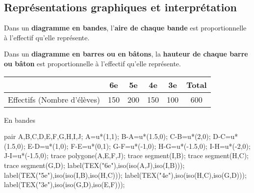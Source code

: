 \begin{changemargin}{0mm}{-15mm}
    \section{Représentations graphiques et interprétation}
    
    \begin{definition}
        Dans un \textbf{diagramme en bandes}, l'\textbf{aire de chaque bande} est proportionnelle à l'effectif qu'elle représente.
    \end{definition}
    \begin{definition}
        Dans un \textbf{diagramme en barres ou en bâtons}, la \textbf{hauteur de chaque barre ou bâton} est proportionnelle à l'effectif qu'elle représente.
    \end{definition}
    \begin{exemples*1}
        \begin{center}
            \begin{tabular}{|c|c|c|c|c|c|}
                \cline{2-6}
                \multicolumn{1}{c|}{}&6e&5e&4e&3e&Total\\
                \hline
                Effectifs (Nombre d'élèves)&150&200&150&100&600\\
                \hline
            \end{tabular}
        
            \bigskip
            En bandes\\\smallskip
            \begin{Geometrie}
                pair A,B,C,D,E,F,G,H,I,J;
                A=u*(1,1);
                B-A=u*(1.5,0);
                C-B=u*(2,0);
                D-C=u*(1.5,0);
                E-D=u*(1,0);
                F-E=u*(0,1);
                G-F=u*(-1,0);
                H-G=u*(-1.5,0);
                I-H=u*(-2,0);
                J-I=u*(-1.5,0);
                trace polygone(A,E,F,J);
                trace segment(I,B);
                trace segment(H,C);
                trace segment(G,D);
                label(TEX("6e"),iso(iso(A,J),iso(I,B)));
                label(TEX("5e"),iso(iso(I,B),iso(H,C)));
                label(TEX("4e"),iso(iso(H,C),iso(G,D)));
                label(TEX("3e"),iso(iso(G,D),iso(E,F)));
            \end{Geometrie}
            

\end{center}
\end{exemples*1}
\end{changemargin}
